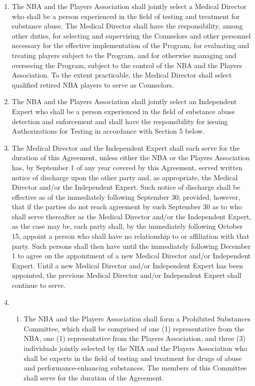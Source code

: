 \documentclass[
]{book}
\providecommand{\tightlist}{%
  \setlength{\itemsep}{0pt}\setlength{\parskip}{0pt}}
\begin{document}
\begin{enumerate}
\def\labelenumi{(\alph{enumi})}
\item
  The NBA and the Players Association shall jointly select a Medical Director who shall be a person experienced in the field of testing and treatment for substance abuse. The Medical Director shall have the responsibility, among other duties, for selecting and supervising the Counselors and other personnel necessary for the effective implementation of the Program, for evaluating and treating players subject to the Program, and for otherwise managing and overseeing the Program, subject to the control of the NBA and the Players Association. To the extent practicable, the Medical Director shall select qualified retired NBA players to serve as Counselors.
\item
  The NBA and the Players Association shall jointly select an Independent Expert who shall be a person experienced in the field of substance abuse detection and enforcement and shall have the responsibility for issuing Authorizations for Testing in accordance with Section 5 below.
\item
  The Medical Director and the Independent Expert shall each serve for the duration of this Agreement, unless either the NBA or the Players Association has, by September 1 of any year covered by this Agreement, served written notice of discharge upon the other party and, as appropriate, the Medical Director and/or the Independent Expert. Such notice of discharge shall be effective as of the immediately following September 30; provided, however, that if the parties do not reach agreement by such September 30 as to who shall serve thereafter as the Medical Director and/or the Independent Expert, as the case may be, each party shall, by the immediately following October 15, appoint a person who shall have no relationship to or affiliation with that party. Such persons shall then have until the immediately following December 1 to agree on the appointment of a new Medical Director and/or Independent Expert. Until a new Medical Director and/or Independent Expert has been appointed, the previous Medical Director and/or Independent Expert shall continue to serve.
\item
  \begin{enumerate}
  \def\labelenumii{(\roman{enumii})}
  \tightlist
  \item
    The NBA and the Players Association shall form a Prohibited Substances Committee, which shall be comprised of one (1) representative from the NBA, one (1) representative from the Players Association, and three (3) individuals jointly selected by the NBA and the Players Association who shall be experts in the field of testing and treatment for drugs of abuse and performance-enhancing substances. The members of this Committee shall serve for the duration of the Agreement.

\end{enumerate}
\end{enumerate}
\end{document}
